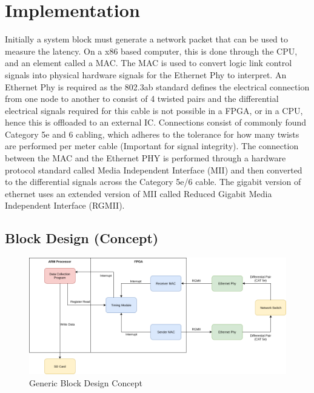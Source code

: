 \chapter{Implementation}\label{C:impl}

\par Initially a system block must generate a network packet that can be used to measure the latency. On a x86 based 
computer, this is done through the CPU, and an element called a MAC. The MAC is used to convert logic link control 
signals into physical hardware signals for the Ethernet Phy to interpret. An Ethernet Phy is required as the 802.3ab 
standard defines the electrical connection from one node to another to consist of 4 twisted pairs and the 
differential electrical signals required for this cable is not possible in a FPGA, or in a CPU, hence this is 
offloaded to an external IC. Connections consist of commonly found Category 5e and 6 cabling, which adheres to the 
tolerance for how many twists are performed per meter cable (Important for signal integrity). The connection between 
the MAC and the Ethernet PHY is performed through a hardware protocol standard called Media Independent Interface 
(MII) and then converted to the differential signals across the Category 5e/6 cable. The gigabit version of ethernet 
uses an extended version of MII called Reduced Gigabit Media Independent Interface (RGMII).

\section{Block Design (Concept)}

\begin{figure}[H]
    \begin{center}
        \includegraphics[keepaspectratio,width=15cm]{Images/BlockDesignConcept}
        \caption{Generic Block Design Concept}
        \label{fig:blockdesignconcept}
    \end{center}
\end{figure}

